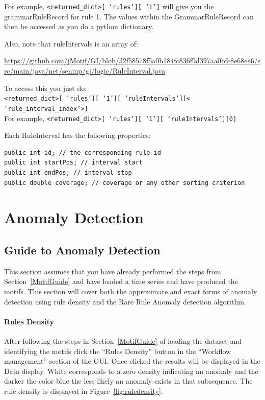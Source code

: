 \documentclass[letterpaper, 12pt]{article}
\def\bsq#1{%
	\lq{#1}\rq}
\begin{document}
For example, \texttt{<returned\_dict>[\bsq{rules}][\bsq{1}]} will give you the grammarRuleRecord for rule 1.  The values within the GrammarRuleRecord can then be accessed as you do a python dictionary.

Also, note that ruleIntervals is an array of:

\small{\url{https://github.com/jMotif/GI/blob/32f58578f5a0b184fc836f9d397aa0bfc8e68ee6/src/main/java/net/seninp/gi/logic/RuleInterval.java}}

To access this you just do:\\
\texttt{<returned\_dict>[\bsq{rules}][\bsq{1}][\bsq{ruleIntervals}][<\bsq{rule\_interval\_index}>]}\\
For example,
\texttt{<returned\_dict>[\bsq{rules}][\bsq{1}][\bsq{ruleIntervals}][0]}

Each RuleInterval has the following properties:
\begin{lstlisting}
public int id; // the corresponding rule id
public int startPos; // interval start
public int endPos; // interval stop
public double coverage; // coverage or any other sorting criterion
\end{lstlisting}


\section{Anomaly Detection}
\label{AnomalyGuide}
\subsection{Guide to Anomaly Detection}

This section assumes that you have already performed the steps from Section~\ref{MotifGuide} and have loaded a time series and have produced the motifs.  This section will cover both the approximate and exact forms of anomaly detection using rule density and the Rare Rule Anomaly detection algorithm.


\paragraph{Rules Density} 

After following the steps in Section~\ref{MotifGuide} of loading the dataset and identifying the motifs click the ``Rules Density'' button in the ``Workflow management'' section of the GUI.  Once clicked the results will be displayed in the Data display.  White corresponds to a zero density indicating an anomaly and the darker the color blue the less likely an anomaly exists in that subsequence.  The rule density is displayed in Figure~\ref{fig:ruledensity}.
\end{document}
